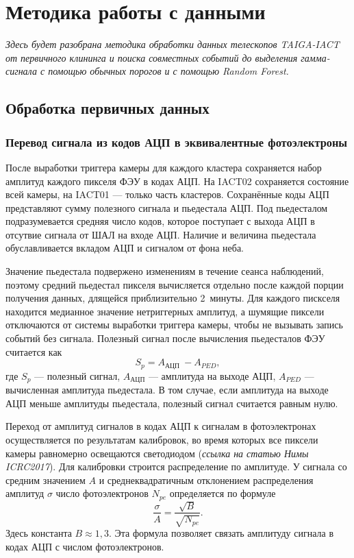\documentclass[magd,floatypics,numeref]{msudipl} %
\begin{document}
\chapter{Методика работы с данными}
\textit{Здесь будет разобрана методика обработки данных телескопов TAIGA-IACT от первичного клининга и поиска совместных событий до выделения гамма-сигнала с помощью обычных порогов и с помощью Random Forest.}
\section{Обработка первичных данных}
\label{primaryDataProcessing}
\subsection{Перевод сигнала из кодов АЦП в эквивалентные фотоэлектроны}
После выработки триггера камеры для каждого кластера сохраняется набор амплитуд каждого пикселя ФЭУ в кодах АЦП. На IACT02 сохраняется состояние всей камеры, на IACT01 --- только часть кластеров. Сохранённые коды АЦП представляют сумму полезного сигнала и пьедестала АЦП. Под пьедесталом подразумевается средняя число кодов, которое поступает с выхода АЦП в отсутвие сигнала от ШАЛ на входе АЦП. Наличие и величина пьедестала обуславливается вкладом АЦП и сигналом от фона неба.

Значение пьедестала подвержено изменениям в течение сеанса наблюдений, поэтому средний пьедестал пикселя вычисляется отдельно после каждой порции получения данных, длящейся приблизительно 2~минуты. Для каждого пискселя находится медианное значение нетриггерных амплитуд, а шумящие пиксели отключаются от системы выработки триггера камеры, чтобы не вызывать запись событий без сигнала. Полезный сигнал после вычисления пьедесталов ФЭУ считается как
\begin{equation}
S_{p}=A_{\text {АЦП }}-A_{P E D},
\end{equation}
где $S_p$ --- полезный сигнал, $A_{\text{АЦП}}$ --- амплитуда на выходе АЦП, $A_{PED}$ --- вычисленная амплитуда пьедестала. В том случае, если амплитуда на выходе АЦП меньше амплитуды пьедестала, полезный сигнал считается равным нулю.

Переход от амплитуд сигналов в кодах АЦП к сигналам в фотоэлектронах осуществляется  по результатам калибровок, во время которых все пиксели камеры равномерно освещаются светодиодом (\autocite{Lubsandorzhiev:2017oi}\textit{ссылка на статью Нимы ICRC2017}).  Для калибровки строится распределение по амплитуде. У сигнала со средним значением $A$ и среднеквадратичным отклонением распределения амплитуд $\sigma$ число фотоэлектронов $N_{pe}$ определяется по формуле
\begin{equation}
\frac{\sigma}{A}=\frac{\sqrt{B}}{\sqrt{N_{p e}}}.
\end{equation}
Здесь константа $B\approx1{,}3$. Эта формула позволяет связать амплитуду сигнала в кодах АЦП с числом фотоэлектронов.
\end{document}
